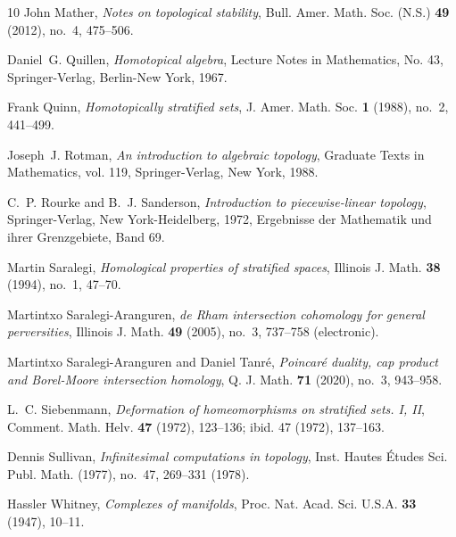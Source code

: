 \documentclass[a4paper,10pt,english,reqno]{amsart}
\theoremstyle{plain}
\theoremstyle{definition}
\theoremstyle{remark}
\numberwithin{equation}{section}
\renewcommand\1{\hbox{\ding{192}}}
\renewcommand\2{\hbox{\ding{193}}}
\newcommand\3{\hbox{\ding{194}}}
\newcommand\4{\hbox{\ding{195}}}
\begin{document}
\begin{thebibliography}{10}
John Mather, \emph{Notes on topological stability}, Bull. Amer. Math. Soc.
  (N.S.) \textbf{49} (2012), no.~4, 475--506. 

Daniel~G. Quillen, \emph{Homotopical algebra}, Lecture Notes in Mathematics,
  No. 43, Springer-Verlag, Berlin-New York, 1967. 

Frank Quinn, \emph{Homotopically stratified sets}, J. Amer. Math. Soc.
  \textbf{1} (1988), no.~2, 441--499. 

Joseph~J. Rotman, \emph{An introduction to algebraic topology}, Graduate Texts
  in Mathematics, vol. 119, Springer-Verlag, New York, 1988. 

C.~P. Rourke and B.~J. Sanderson, \emph{Introduction to piecewise-linear
  topology}, Springer-Verlag, New York-Heidelberg, 1972, Ergebnisse der
  Mathematik und ihrer Grenzgebiete, Band 69. 

Martin Saralegi, \emph{Homological properties of stratified spaces}, Illinois
  J. Math. \textbf{38} (1994), no.~1, 47--70. 

Martintxo Saralegi-Aranguren, \emph{de {R}ham intersection cohomology for
  general perversities}, Illinois J. Math. \textbf{49} (2005), no.~3, 737--758
  (electronic). 

Martintxo Saralegi-Aranguren and Daniel Tanr\'{e}, \emph{Poincar\'{e} duality,
  cap product and {B}orel-{M}oore intersection homology}, Q. J. Math.
  \textbf{71} (2020), no.~3, 943--958. 

L.~C. Siebenmann, \emph{Deformation of homeomorphisms on stratified sets. {I},
  {II}}, Comment. Math. Helv. \textbf{47} (1972), 123--136; ibid. 47 (1972),
  137--163. 

Dennis Sullivan, \emph{Infinitesimal computations in topology}, Inst. Hautes
  \'Etudes Sci. Publ. Math. (1977), no.~47, 269--331 (1978). 

Hassler Whitney, \emph{Complexes of manifolds}, Proc. Nat. Acad. Sci. U.S.A.
  \textbf{33} (1947), 10--11. 

\end{thebibliography}
%
\end{document}
